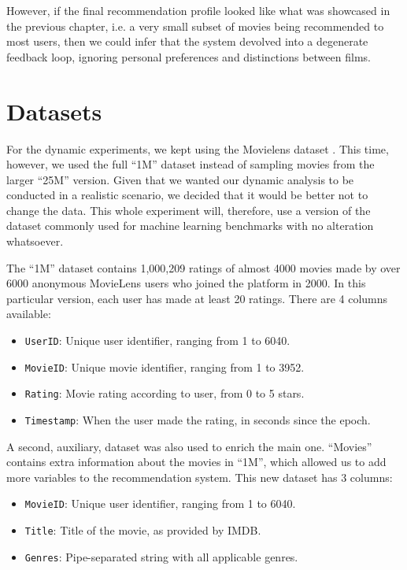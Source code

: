 However, if the final recommendation profile looked like what was showcased in
the previous chapter, i.e. a very small subset of movies being recommended to
most users, then we could infer that the system devolved into a degenerate
feedback loop, ignoring personal preferences and distinctions between films.

\section{Datasets}
\label{sec:datasets04}

For the dynamic experiments, we kept using the Movielens dataset \citep{}. This
time, however, we used the full ``1M'' dataset instead of sampling movies from
the larger ``25M'' version. Given that we wanted our dynamic analysis to be
conducted in a realistic scenario, we decided that it would be better not to
change the data. This whole experiment will, therefore, use a version of the
dataset commonly used for machine learning benchmarks with no alteration
whatsoever.

The ``1M'' dataset contains 1,000,209 ratings of almost 4000 movies made by over
6000 anonymous MovieLens users who joined the platform in 2000. In this
particular version, each user has made at least 20 ratings. There are 4 columns
available:

\begin{itemize}
  \item \verb|UserID|: Unique user identifier, ranging from 1 to 6040.
  \item \verb|MovieID|: Unique movie identifier, ranging from 1 to 3952.
  \item \verb|Rating|: Movie rating according to user, from 0 to 5 stars.
  \item \verb|Timestamp|: When the user made the rating, in seconds since the
  epoch.
\end{itemize}

A second, auxiliary, dataset was also used to enrich the main one. ``Movies''
contains extra information about the movies in ``1M'', which allowed us to add
more variables to the recommendation system. This new dataset has 3 columns:

\begin{itemize}
  \item \verb|MovieID|: Unique user identifier, ranging from 1 to 6040.
  \item \verb|Title|: Title of the movie, as provided by IMDB.
  \item \verb|Genres|: Pipe-separated string with all applicable genres.
\end{itemize}

